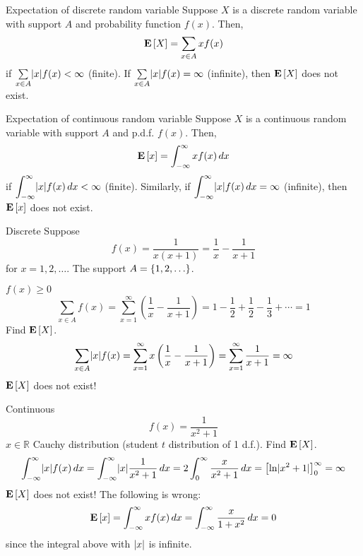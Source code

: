 \begin{Definition}{Expectation of discrete random variable}{}
    Suppose $ X $ is a discrete random variable with support
    $ A $ and probability function $ f(x) $. Then,
    \[ \bm{\mathrm{E}}\left[X\right]=\sum\limits_{x\in A}x f(x)  \]
    if $ \sum\limits_{x\in A}\lvert x\rvert f(x) < \infty $ (finite).
    If $ \sum\limits_{x\in A}\lvert x\rvert f(x) =\infty $ (infinite), then
    $ \bm{\mathrm{E}}\left[X\right] $ does not exist.
\end{Definition}

\begin{Definition}{Expectation of continuous random variable}{}
    Suppose $ X $ is a continuous random variable with support $ A $
    and p.d.f. $ f(x) $. Then,
    \[ \bm{\mathrm{E}}\left[x\right]=\int_{-\infty}^{\infty} x f(x)\, d{x}  \]
    if $ \displaystyle \int_{-\infty}^{\infty} \lvert x\rvert f(x)\, d{x} <\infty $
    (finite). Similarly,
    if $ \displaystyle \int_{-\infty}^{\infty} \lvert x\rvert f(x)\, d{x} =\infty $
    (infinite),
    then $ \bm{\mathrm{E}}\left[x\right] $ does not exist.
\end{Definition}

\begin{Example}{Discrete}{}
    Suppose
    \[ f(x)=\frac{1}{x(x+1)}=\frac{1}{x} -\frac{1}{x+1}  \]
    for $ x=1,2,\ldots $. The support $ A=\{1,2,\ldots\} $.

    $ f(x)\geqslant 0 $
    \[ \sum\limits_{x\in A}f(x)=\sum\limits_{x=1}^{\infty}
        \left( \frac{1}{x} -\frac{1}{x+1} \right)=
        1-\frac{1}{2} +\frac{1}{2} -\frac{1}{3} +\cdots=1  \]
    Find $ \bm{\mathrm{E}}\left[X\right] $.
    \[ \sum\limits_{x\in A}\lvert x\rvert f(x)=\sum\limits_{x=1}^{\infty}
        x\left( \frac{1}{x} -\frac{1}{x+1} \right)
        =\sum\limits_{x=1}^{\infty} \frac{1}{x+1} =\infty  \]
    $ \bm{\mathrm{E}}\left[X\right] $ does not exist!
\end{Example}

\begin{Example}{Continuous}{}
    \[ f(x)=\frac{1}{x^2+1} \]
    $ x\in\mathbb{R} $ Cauchy distribution
    (student $ t $ distribution of 1 d.f.). Find $ \bm{\mathrm{E}}\left[X\right] $.
    \[ \int_{-\infty}^{\infty} \lvert x\rvert f(x)\, d{x} =
        \int_{-\infty}^{\infty} \lvert x\rvert\frac{1}{x^2+1} \, d{x}=
        2 \int_{0}^{\infty} \frac{x}{x^2+1} \, d{x} =
        \bigl[\ln\lvert x^2+1\rvert\bigr]_0^\infty=\infty \]
    $ \bm{\mathrm{E}}\left[X\right] $ does not exist! The following is wrong:
    \[ \bm{\mathrm{E}}\left[x\right]=\int_{-\infty}^{\infty}x f(x)\, d{x}=
        \int_{-\infty}^{\infty} \frac{x}{1+x^2} \, d{x}=0  \]
    since the integral above with $ \lvert x\rvert $ is infinite.
\end{Example}

